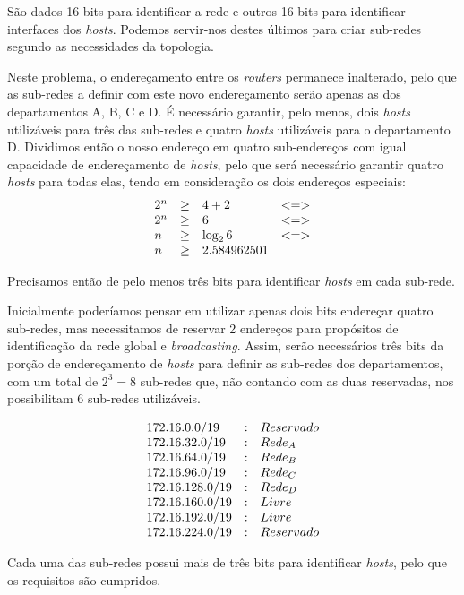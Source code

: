 \documentclass{llncs}
\begin{document}
São dados 16 bits para identificar a rede e outros 16 bits para identificar interfaces dos \textit{hosts}. Podemos servir-nos destes últimos para criar sub-redes segundo as necessidades da topologia.

Neste problema, o endereçamento entre os \textit{routers} permanece inalterado, pelo que as sub-redes a definir com este novo endereçamento serão apenas as dos departamentos A, B, C e D. É necessário garantir, pelo menos, dois \textit{hosts} utilizáveis para três das sub-redes e quatro \textit{hosts} utilizáveis para o departamento D. Dividimos então o nosso endereço em quatro sub-endereços com igual capacidade de endereçamento de \textit{hosts}, pelo que será necessário garantir quatro \textit{hosts} para todas elas, tendo em consideração os dois endereços especiais:\\

\[
\begin{array}{l l l l l l l l}
2^n&\geq&4 + 2& <=>\\
2^n&\geq&6& <=> \\
n&\geq&\log_{2} 6& <=> \\
n&\geq&2.584962501
\end{array}
\]

Precisamos então de pelo menos três bits para identificar \textit{hosts} em cada sub-rede.

Inicialmente poderíamos pensar em utilizar apenas dois bits endereçar quatro sub-redes, mas necessitamos de reservar 2 endereços para propósitos de identificação da rede global e \textit{broadcasting}. Assim, serão necessários três bits da porção de endereçamento de \textit{hosts} para definir as sub-redes dos departamentos, com um total de $2^3 = 8$ sub-redes que, não contando com as duas reservadas, nos possibilitam 6 sub-redes utilizáveis.

\[
\begin{array} {l l l l l l l}
172.16.0.0/19  &:&Reservado \\
172.16.32.0/19 &:&Rede_A \\
172.16.64.0/19 &:&Rede_B \\
172.16.96.0/19 &:&Rede_C \\
172.16.128.0/19&:&Rede_D \\
172.16.160.0/19&:&Livre \\
172.16.192.0/19&:&Livre \\
172.16.224.0/19&:&Reservado
\end{array}
\]

Cada uma das sub-redes possui mais de três bits para identificar \textit{hosts}, pelo que os requisitos são cumpridos. 
\end{document}
